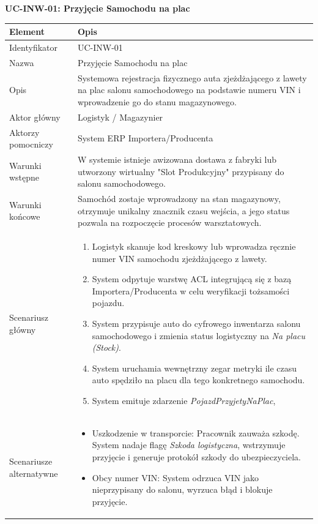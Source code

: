\textbf{UC-INW-01: Przyjęcie Samochodu na plac}

\begin{longtable}{|p{4cm}|p{11cm}|}
\hline
\textbf{Element} & \textbf{Opis} \\
\hline

Identyfikator & UC-INW-01 \\
\hline

Nazwa & Przyjęcie Samochodu na plac \\
\hline

Opis &
Systemowa rejestracja fizycznego auta zjeżdżającego z lawety na plac salonu samochodowego na podstawie numeru VIN i wprowadzenie go do stanu magazynowego. \\
\hline

Aktor główny & Logistyk / Magazynier \\
\hline

Aktorzy pomocniczy & System ERP Importera/Producenta  \\
\hline

Warunki wstępne &
W systemie istnieje awizowana dostawa z fabryki lub utworzony wirtualny "Slot Produkcyjny" przypisany do salonu samochodowego. \\
\hline

Warunki końcowe &
Samochód zostaje wprowadzony na stan magazynowy, otrzymuje unikalny znacznik czasu wejścia, a jego status pozwala na rozpoczęcie procesów warsztatowych. \\
\hline

Scenariusz główny &
\begin{enumerate}
\item Logistyk skanuje kod kreskowy lub wprowadza ręcznie numer VIN samochodu zjeżdżającego z lawety.
\item System odpytuje warstwę ACL integrującą się z bazą Importera/Producenta w celu weryfikacji tożsamości pojazdu.
\item System przypisuje auto do cyfrowego inwentarza salonu samochodowego i zmienia status logistyczny na \textit{Na placu (Stock)}.
\item System uruchamia wewnętrzny zegar metryki ile czasu auto spędziło na placu dla tego konkretnego samochodu.
\item System emituje zdarzenie \textit{PojazdPrzyjetyNaPlac},
\end{enumerate}
\\
\hline

Scenariusze alternatywne &
\begin{itemize}
\item [A1] Uszkodzenie w transporcie: Pracownik zauważa szkodę. System nadaje flagę \textit{Szkoda logistyczna}, wstrzymuje przyjęcie i generuje protokół szkody do ubezpieczyciela.
\item [A2] Obcy numer VIN: System odrzuca VIN jako nieprzypisany do salonu, wyrzuca błąd i blokuje przyjęcie.
\end{itemize}
\\
\hline

\end{longtable}